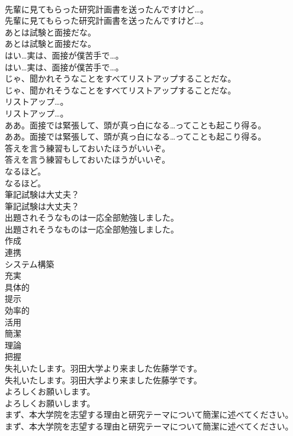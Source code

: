 \documentclass[8pt]{extreport}
\begin{document}
\begin{CJK}{UTF8}{min}
\\	先輩に見てもらった研究計画書を送ったんですけど…。	
\\	先輩に見てもらった研究計画書を送ったんですけど…。 
\\	あとは試験と面接だな。	
\\	あとは試験と面接だな。 
\\	はい…実は、面接が僕苦手で…。	
\\	はい…実は、面接が僕苦手で…。 
\\	じゃ、聞かれそうなことをすべてリストアップすることだな。	
\\	じゃ、聞かれそうなことをすべてリストアップすることだな。 
\\	リストアップ…。	
\\	リストアップ…。 
\\	ああ。面接では緊張して、頭が真っ白になる…ってことも起こり得る。	
\\	ああ。面接では緊張して、頭が真っ白になる…ってことも起こり得る。 
\\	答えを言う練習もしておいたほうがいいぞ。	
\\	答えを言う練習もしておいたほうがいいぞ。 
\\	なるほど。	
\\	なるほど。 
\\	筆記試験は大丈夫？	
\\	筆記試験は大丈夫？ 
\\	出題されそうなものは一応全部勉強しました。	
\\	出題されそうなものは一応全部勉強しました。 
\\	作成
\\	連携
\\	システム構築
\\	充実
\\	具体的
\\	提示
\\	効率的
\\	活用
\\	簡潔
\\	理論
\\	把握
\\	失礼いたします。羽田大学より来ました佐藤学です。	
\\	失礼いたします。羽田大学より来ました佐藤学です。 
\\	よろしくお願いします。	
\\	よろしくお願いします。 
\\	まず、本大学院を志望する理由と研究テーマについて簡潔に述べてください。	
\\	まず、本大学院を志望する理由と研究テーマについて簡潔に述べてください。 

\end{CJK}
\end{document}
